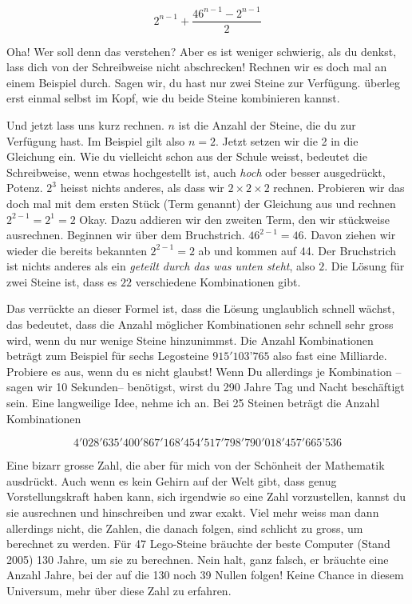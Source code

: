 $$2^{n-1}+\frac{46^{n-1}-2^{n-1}}{2}$$

Oha! Wer soll denn das verstehen? Aber es ist weniger schwierig, als du denkst, lass dich von der Schreibweise nicht abschrecken! Rechnen wir es doch mal an einem Beispiel durch. Sagen wir, du hast nur zwei Steine zur Verfügung. überleg erst einmal selbst im Kopf, wie du beide Steine kombinieren kannst.

Und jetzt lass uns kurz rechnen. $n$ ist die Anzahl der Steine, die du zur Verfügung hast. Im Beispiel gilt also $n=2$. Jetzt setzen wir die 2 in die Gleichung ein. Wie du vielleicht schon aus der Schule weisst, bedeutet die Schreibweise, wenn etwas hochgestellt ist, auch \textit{hoch} oder besser ausgedrückt, Potenz. $2^3$ heisst nichts anderes, als dass wir $2\times2\times2$ rechnen. Probieren wir das doch mal mit dem ersten Stück (Term genannt) der Gleichung aus und rechnen $2^{2-1}=2^1=2$ Okay. Dazu addieren wir den zweiten Term, den wir stückweise ausrechnen. Beginnen wir über dem Bruchstrich. $46^{2-1}=46$. Davon ziehen wir wieder die bereits bekannten $2^{2-1}=2$ ab und kommen auf 44. Der Bruchstrich ist nichts anderes als ein \textit{geteilt durch das was unten steht}, also $2$. Die Lösung für zwei Steine ist, dass es $22$ verschiedene Kombinationen gibt.

Das verrückte an dieser Formel ist, dass die Lösung unglaublich schnell wächst, das bedeutet, dass die Anzahl möglicher Kombinationen sehr schnell sehr gross wird, wenn du nur wenige Steine hinzunimmst. Die Anzahl Kombinationen beträgt zum Beispiel für sechs Legosteine $915'103’765$ also fast eine Milliarde. Probiere es aus, wenn du es nicht glaubst! Wenn Du allerdings je Kombination --sagen wir 10 Sekunden-- benötigst, wirst du 290 Jahre Tag und Nacht beschäftigt sein. Eine langweilige Idee, nehme ich an. Bei 25 Steinen beträgt die Anzahl Kombinationen

\begin{footnotesize}
$$4'028'635'400'867'168'454'517'798'790'018'457'665’536$$
\end{footnotesize}

Eine bizarr grosse Zahl, die aber für mich von der Schönheit der Mathematik ausdrückt. Auch wenn es kein Gehirn auf der Welt gibt, dass genug Vorstellungskraft haben kann, sich irgendwie so eine Zahl vorzustellen, kannst du sie ausrechnen und hinschreiben und zwar exakt. Viel mehr weiss man dann allerdings nicht, die Zahlen, die danach folgen, sind schlicht zu gross, um berechnet zu werden. Für 47 Lego-Steine bräuchte der beste Computer (Stand 2005) 130 Jahre, um sie zu berechnen. Nein halt, ganz falsch, er bräuchte eine Anzahl Jahre, bei der auf die 130 noch 39 Nullen folgen! Keine Chance in diesem Universum, mehr über diese Zahl zu erfahren.


